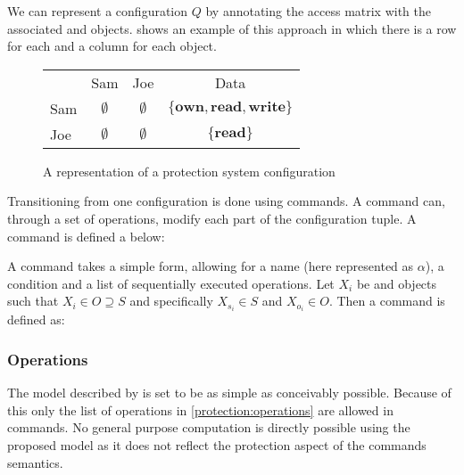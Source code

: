 We can represent a configuration $Q$ by annotating the access matrix with the associated \subjects{} and objects.
 shows an example of this approach in which there is a row for each \ssubject{} and a column for each object.

\begin{figure}[h]
\centering
\begin{tabular}{l|c|c|c|}
\multicolumn{1}{c}{} & \multicolumn{1}{c}{Sam} & \multicolumn{1}{c}{Joe} & \multicolumn{1}{c}{Data} \\\cline{2-4}
Sam & $\emptyset$ & $\emptyset$ & $\{\textbf{own}, \textbf{read}, \textbf{write}\}$ \\\cline{2-4}
Joe & $\emptyset$ & $\emptyset$ & $\{\textbf{read}\}$ \\\cline{2-4}
\end{tabular}
\caption{A representation of a protection system configuration}
\label{protection:matrixsmall}
\end{figure}

Transitioning from one configuration is done using commands.
A command can, through a set of operations, modify each part of the configuration tuple.
A command is defined a below:

\begin{definition}
A command takes a simple form, allowing for a name (here represented as $\alpha$), a condition and a list of sequentially executed operations.
Let $X_i$ be \subjects{} and objects such that $X_i \in O \supseteq S$ and specifically $X_{s_i} \in S$ and $X_{o_i} \in O$.
Then a command is defined as:
\begin{algorithm}[H]
  \DontPrintSemicolon
  \cmd {} 
\end{algorithm}
\end{definition}

\subsubsection{Operations}
The model described by \citet{HRU} is set to be as simple as conceivably possible.
Because of this only the list of operations in \cref{protection:operations} are allowed in commands.
No general purpose computation is directly possible using the proposed model as it does not reflect the protection aspect of the commands semantics.

